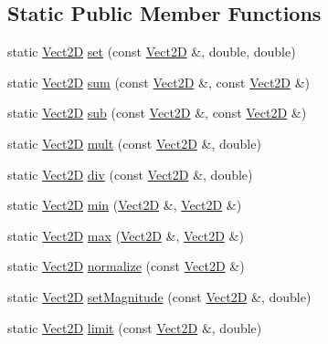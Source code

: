 \subsection*{Static Public Member Functions}
\begin{DoxyCompactItemize}
\item 
static \hyperlink{classVect2D}{Vect2D} \hyperlink{classVect2D_a713fc308bd6d3efef5ff9d5b5e9ae426_a713fc308bd6d3efef5ff9d5b5e9ae426}{set} (const \hyperlink{classVect2D}{Vect2D} \&, double, double)
\item 
static \hyperlink{classVect2D}{Vect2D} \hyperlink{classVect2D_a41c1598c79a24bf2d819f2762cb83d58_a41c1598c79a24bf2d819f2762cb83d58}{sum} (const \hyperlink{classVect2D}{Vect2D} \&, const \hyperlink{classVect2D}{Vect2D} \&)
\item 
static \hyperlink{classVect2D}{Vect2D} \hyperlink{classVect2D_a338c5688a1264ece021066dff5c96f32_a338c5688a1264ece021066dff5c96f32}{sub} (const \hyperlink{classVect2D}{Vect2D} \&, const \hyperlink{classVect2D}{Vect2D} \&)
\item 
static \hyperlink{classVect2D}{Vect2D} \hyperlink{classVect2D_a4036230e4f31e21784c268fc02dcd090_a4036230e4f31e21784c268fc02dcd090}{mult} (const \hyperlink{classVect2D}{Vect2D} \&, double)
\item 
static \hyperlink{classVect2D}{Vect2D} \hyperlink{classVect2D_a6e1503bbca56226b6f942ea63c5fbbff_a6e1503bbca56226b6f942ea63c5fbbff}{div} (const \hyperlink{classVect2D}{Vect2D} \&, double)
\item 
static \hyperlink{classVect2D}{Vect2D} \hyperlink{classVect2D_abfce9e126bec3019747932c0fd9ef951_abfce9e126bec3019747932c0fd9ef951}{min} (\hyperlink{classVect2D}{Vect2D} \&, \hyperlink{classVect2D}{Vect2D} \&)
\item 
static \hyperlink{classVect2D}{Vect2D} \hyperlink{classVect2D_a65d0e20a2cc8b7cc7670e830c74f1457_a65d0e20a2cc8b7cc7670e830c74f1457}{max} (\hyperlink{classVect2D}{Vect2D} \&, \hyperlink{classVect2D}{Vect2D} \&)
\item 
static \hyperlink{classVect2D}{Vect2D} \hyperlink{classVect2D_a942fc02dc6fca9d2d9170316300d5d7f_a942fc02dc6fca9d2d9170316300d5d7f}{normalize} (const \hyperlink{classVect2D}{Vect2D} \&)
\item 
static \hyperlink{classVect2D}{Vect2D} \hyperlink{classVect2D_a2d33dc31e186617af5a6919f1e94e39f_a2d33dc31e186617af5a6919f1e94e39f}{set\+Magnitude} (const \hyperlink{classVect2D}{Vect2D} \&, double)
\item 
static \hyperlink{classVect2D}{Vect2D} \hyperlink{classVect2D_a06e0fccb35246c39442b68a675ed1aca_a06e0fccb35246c39442b68a675ed1aca}{limit} (const \hyperlink{classVect2D}{Vect2D} \&, double)

\end{DoxyCompactItemize}
